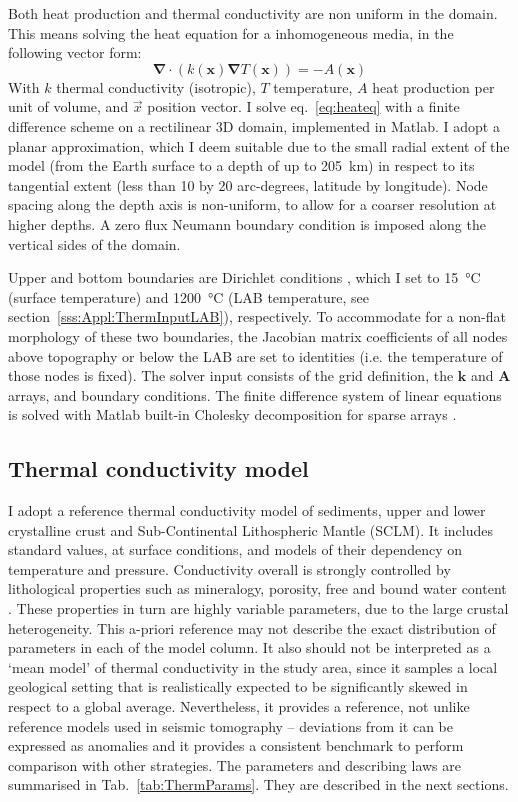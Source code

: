 Both heat production and thermal conductivity are non uniform in the domain.
This means solving the heat equation for a inhomogeneous media, in the following vector form:
\begin{equation}
\label{eq:heateq}
\mathbf{\nabla} \cdot ( k(\mathbf{x}) \mathbf{\nabla} T(\mathbf{x}) ) = - A(\mathbf{x})
\end{equation}
With $k$ thermal conductivity (isotropic), $T$ temperature, $A$ heat production per unit of volume, and $\vec{x}$ position vector.
I solve eq.~\ref{eq:heateq} with a finite difference scheme on a rectilinear 3D domain, implemented in Matlab.
I adopt a planar approximation, which I deem suitable due to the small radial extent of the model (from the Earth surface to a depth of up to 205~\si{\kilo \metre}) in respect to its tangential extent (less than 10 by 20 arc-degrees, latitude by longitude).
Node spacing along the depth axis is non-uniform, to allow for a coarser resolution at higher depths.
A zero flux Neumann boundary condition \parencite{smith1985} is imposed along the vertical sides of the domain.

Upper and bottom boundaries are Dirichlet conditions \parencite{smith1985}, which I set to \SI{15}{\celsius} (surface temperature) and \SI{1200}{\celsius} (LAB temperature, see section~\ref{sss:Appl:ThermInputLAB}), respectively.
To accommodate for a non-flat morphology of these two boundaries, the Jacobian matrix coefficients of all nodes above topography or below the LAB are set to identities (i.e. the temperature of those nodes is fixed).
The solver input consists of the grid definition, the $\mathbf{k}$ and $\mathbf{A}$ arrays, and boundary conditions.
The finite difference system of linear equations is solved with Matlab built-in Cholesky decomposition for sparse arrays \parencite{Davis2006}.

\subsection{Thermal conductivity model}
\label{ss:Appl:ThermCond}
I adopt a reference thermal conductivity model of sediments, upper and lower crystalline crust and Sub-Continental Lithospheric Mantle (SCLM).
It includes standard values, at surface conditions, and models of their dependency on temperature and pressure.
Conductivity overall is strongly controlled by lithological properties such as mineralogy, porosity, free and bound water content \parencites{allen2013basin}{schon2011handbook}.
These properties in turn are highly variable parameters, due to the large crustal heterogeneity.
This a-priori reference may not describe the exact distribution of parameters in each of the model column.
It also should not be interpreted as a `mean model' of thermal conductivity in the study area, since it samples a local geological setting that is realistically expected to be significantly skewed in respect to a global average.
Nevertheless, it provides a reference, not unlike reference models used in seismic tomography -- deviations from it can be expressed as anomalies and it provides a consistent benchmark to perform comparison with other strategies.
The parameters and describing laws are summarised in Tab.~\ref{tab:ThermParams}.
They are described in the next sections.


